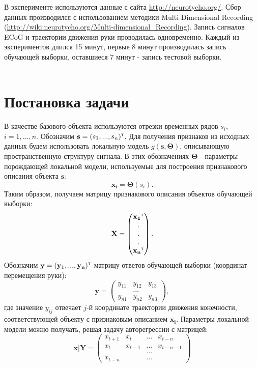 \documentclass[12pt,twoside]{article}
\begin{document}
В эксперименте используются данные с сайта \url{http://neurotycho.org/}. Сбор данных производился с использованием методики Multi-Dimensional Recording (\url{http://wiki.neurotycho.org/Multi-dimensional_Recording}). Запись сигналов ECoG и траектории движения руки проводилась одновременно. Каждый из экспериментов длился 15 минут, первые 8 минут производилась запись обучающей выборки, оставшиеся 7 минут - запись тестовой выборки. \\\\

\section{Постановка задачи}
В качестве базового объекта используются отрезки временных рядов $s_i$, $i=1,...,n$. Обозначим $\mathbf{s}=(s_1,...,s_n)^{\text{\tiny\sffamily\upshape\mdseries T}}$. Для получения признаков из исходных данных будем использовать локальную модель $g(\mathbf{s}, \mathbf{\Theta})$, описывающую пространственную структуру сигнала. В этих обозначениях $\mathbf{\Theta}$ - параметры порождающей локальной модели, используемые для построения признакового описания объекта $\mathbf{s}$:
\begin{equation}
 \mathbf{x_i} = \mathbf{\Theta}(s_i).
\end{equation}
Таким образом, получаем матрицу признакового описания объектов обучающей выборки:
\begin{equation}
	\mathbf{X}=
	\begin{pmatrix}
		\mathbf{x_1}^{\text{\tiny\sffamily\upshape\mdseries T}}\\
		.\\
		.\\
		.\\
		\mathbf{x_n}^{\text{\tiny\sffamily\upshape\mdseries T}}
	\end{pmatrix}.
\end{equation}
Обозначим $\mathbf{y}=(\mathbf{y_1},...,\mathbf{y_n})^{\text{\tiny\sffamily\upshape\mdseries T}}$ матрицу ответов обучающей выборки (координат перемещения руки):
\begin{equation}
	\mathbf{y}=
	\begin{pmatrix}
		y_{11}&y_{12}&y_{13}\\
		&...&\\
		y_{n1}&y_{n2}&y_{n3}
	\end{pmatrix},
\end{equation} 
где значение $y_{ij}$ отвечает $j$-й координате траектории движения конечности, соответствующей объекту с признаковым описанием $\mathbf{x_i}$. Параметры локальной модели можно получать, решая задачу авторегрессии с матрицей:
\begin{equation}
	\mathbf{x}|\mathbf{Y}=
	\begin{pmatrix}
		x_{t+1}&x_t&...&x_{t-n}\\
		x_t&x_{t-1}&...&x_{t-n-1}\\
		&&...&\\
		x_{t-n}&&...&
	\end{pmatrix}
\end{equation} 
\end{document}

